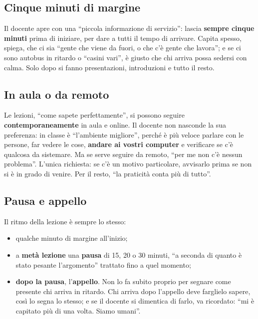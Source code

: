 \subsection{Cinque minuti di margine}

Il docente apre con una ``piccola informazione di servizio'': lascia
\textbf{sempre cinque minuti} prima di iniziare, per dare a tutti il tempo di
arrivare. Capita spesso, spiega, che ci sia ``gente che viene da fuori, o che
c'è gente che lavora''; e se ci sono autobus in ritardo o ``casini vari'', è
giusto che chi arriva possa sedersi con calma. Solo dopo si fanno
presentazioni, introduzioni e tutto il resto.

\subsection{In aula o da remoto}

Le lezioni, ``come sapete perfettamente'', si possono seguire
\textbf{contemporaneamente} in aula e online. Il docente non nasconde la sua
preferenza: in classe è ``l'ambiente migliore'', perché è più veloce parlare
con le persone, far vedere le cose, \textbf{andare ai vostri computer} e
verificare se c'è qualcosa da sistemare. Ma se serve seguire da remoto, ``per
me non c'è nessun problema''. L'unica richiesta: se c'è un motivo particolare,
avvisarlo prima se non si è in grado di venire. Per il resto, ``la praticità
conta più di tutto''.

\subsection{Pausa e appello}

Il ritmo della lezione è sempre lo stesso:
\begin{itemize}
  \item qualche minuto di margine all'inizio;
  \item a \textbf{metà lezione} una \textbf{pausa} di 15, 20 o 30 minuti,
        ``a seconda di quanto è stato pesante l'argomento'' trattato fino a
        quel momento;
  \item \textbf{dopo la pausa}, l'\textbf{appello}. Non lo fa subito
        proprio per segnare come presente chi arriva in ritardo. Chi arriva
        dopo l'appello deve farglielo sapere, così lo segna lo stesso; e se
        il docente si dimentica di farlo, va ricordato: ``mi è capitato più
        di una volta. Siamo umani''.
\end{itemize}

